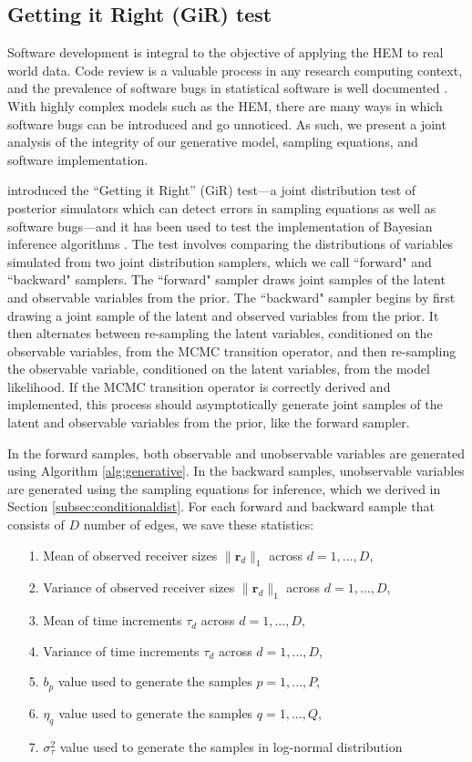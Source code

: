 \documentclass[ba]{imsart}
\numberwithin{equation}{section}
\theoremstyle{plain}
\begin{document}
	\subsection{Getting it Right (GiR) test} \label{subec:GiR}
	Software development is integral to the objective of applying the HEM to real world data. Code review is a valuable process in any research computing context, and the prevalence of software bugs in statistical software is well documented \citep[e.g., ][]{altman2004numerical,mccullough2009accuracy}.  With highly complex models such as the HEM, there are many ways in which software bugs can be introduced and go unnoticed. As such, we present a joint analysis of the integrity of our generative model, sampling equations, and software implementation. 
	
	\cite{geweke2004getting} introduced the ``Getting it Right'' (GiR) test---a joint distribution test of posterior simulators which can detect errors in sampling equations as well as software bugs---and it has been used to test the implementation of Bayesian inference algorithms \citep{zhao2016bayesian}.  The test involves comparing the distributions of variables simulated from two joint distribution samplers, which we call ``forward" and ``backward" samplers. The ``forward" sampler draws joint samples of the latent and observable variables from the prior. The ``backward" sampler begins by first drawing a joint sample of the latent and observed variables from the prior. It then alternates between re-sampling the latent variables, conditioned on the observable variables, from the MCMC transition operator, and then re-sampling the observable variable, conditioned on the latent variables, from the model likelihood. If the MCMC transition operator is correctly derived and implemented, this process should asymptotically generate joint samples of the latent and observable variables from the prior, like the forward sampler.
		
	In the forward samples, both observable and unobservable variables are generated using Algorithm \ref{alg:generative}. In the backward samples, unobservable variables are generated using the sampling equations for inference, which we derived in Section \ref{subsec:conditionaldist}. For each forward and backward sample that consists of $D$ number of edges, we save these statistics:
	\begin{itemize}
		\item[1.] Mean of observed receiver sizes $ \lVert \boldsymbol{r}_{d} \rVert_1 $ across $d=1,\ldots,D$,
		\item[2.] Variance of observed receiver sizes $ \lVert \boldsymbol{r}_{d} \rVert_1 $ across $d=1,\ldots,D$,
		\item[3.] Mean of time increments $\tau_d$ across $d=1,...,D$,
		\item[4.] Variance of time increments $\tau_d$ across $d=1,...,D$,
		\item[5.] $b_p$ value used to generate the samples $p = 1,...,P$,
		\item[6.] $\eta_q$ value used to generate the samples $q = 1,...,Q$,
		\item[7.] $\sigma^2_\tau$ value used to generate the samples in log-normal distribution
	\end{itemize}
\end{document}
